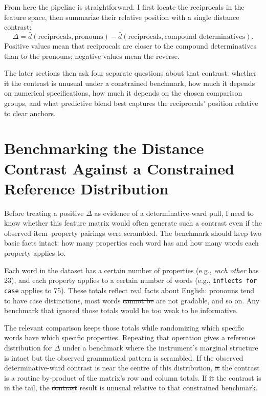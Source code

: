 \documentclass[12pt]{article}
\providecommand{\mention}[1]{\textit{#1}}
\providecommand{\DIFaddtex}[1]{{\protect\color{DIFgreen}#1}} %
\providecommand{\DIFdeltex}[1]{{\protect\color{red}\sout{#1}}}                      %
\providecommand{\DIFaddbegin}{} %
\providecommand{\DIFaddend}{} %
\providecommand{\DIFdelbegin}{} %
\providecommand{\DIFdelend}{} %
\providecommand{\DIFadd}[1]{\texorpdfstring{\DIFaddtex{#1}}{#1}} %
\providecommand{\DIFdel}[1]{\texorpdfstring{\DIFdeltex{#1}}{}} %
\newcommand{\DIFscaledelfig}{0.5}
\newlength{\DIFdelgraphicswidth} %
\newlength{\DIFdelgraphicsheight} %
\newcommand{\DIFaddincludegraphics}[2][]{{\color{DIFgreen}\fbox{\DIFOincludegraphics[#1]{#2}}}} %
\newcommand{\DIFdelincludegraphics}[2][]{%
\sbox{\DIFdelgraphicsbox}{\DIFOincludegraphics[#1]{#2}}%
\settoboxwidth{\DIFdelgraphicswidth}{\DIFdelgraphicsbox} %
\settoboxtotalheight{\DIFdelgraphicsheight}{\DIFdelgraphicsbox} %
\scalebox{\DIFscaledelfig}{%
\parbox[b]{\DIFdelgraphicswidth}{\usebox{\DIFdelgraphicsbox}\\[-\baselineskip] \rule{\DIFdelgraphicswidth}{0em}}\llap{\resizebox{\DIFdelgraphicswidth}{\DIFdelgraphicsheight}{%
\setlength{\unitlength}{\DIFdelgraphicswidth}%
\begin{picture}(1,1)%
\thicklines\linethickness{2pt} %
{\color[rgb]{1,0,0}\put(0,0){\framebox(1,1){}}}%
{\color[rgb]{1,0,0}\put(0,0){\line( 1,1){1}}}%
{\color[rgb]{1,0,0}\put(0,1){\line(1,-1){1}}}%
\end{picture}%
}\hspace*{3pt}}} %
} %
\DeclareRobustCommand{\DIFaddbegin}{\DIFOaddbegin \let\includegraphics\DIFaddincludegraphics} %
\DeclareRobustCommand{\DIFaddend}{\DIFOaddend \let\includegraphics\DIFOincludegraphics} %
\DeclareRobustCommand{\DIFdelbegin}{\DIFOdelbegin \let\includegraphics\DIFdelincludegraphics} %
\DeclareRobustCommand{\DIFdelend}{\DIFOaddend \let\includegraphics\DIFOincludegraphics} %
\begin{document}
From here the pipeline is straightforward. I first locate the reciprocals in the feature space, then summarize their relative position with a single distance contrast:
\[
\Delta = \bar d(\text{reciprocals},\text{pronouns})
       - \bar d(\text{reciprocals},\text{compound determinatives}).
\]
Positive values mean that reciprocals are closer to the compound determinatives than to the pronouns; negative values mean the reverse.

The later sections then ask four separate questions about that contrast: whether \DIFdelbegin \DIFdel{it }\DIFdelend \DIFaddbegin \DIFadd{the contrast }\DIFaddend is unusual under a constrained benchmark, how much it depends on numerical specifications, how much it depends on the chosen comparison groups, and what predictive blend best captures the reciprocals' position relative to clear anchors.

\FloatBarrier

\section{Benchmarking the Distance Contrast Against a Constrained Reference Distribution}

Before treating a positive \(\Delta\) as evidence of a determinative-ward pull, I need to know whether this feature matrix would often generate such a contrast even if the observed item--property pairings were scrambled. The benchmark should keep two basic facts intact: how many properties each word has and how many words each property applies to.

Each word in the dataset has a certain number of properties (e.g., \mention{each other} has 23), and each property applies to a certain number of words (e.g., \texttt{inflects for case} applies to 75). These totals reflect real facts about English: pronouns tend to have case distinctions, most words \DIFdelbegin \DIFdel{cannot be }\DIFdelend \DIFaddbegin \DIFadd{are not }\DIFaddend gradable, and so on. Any benchmark that ignored those totals would be too weak to be informative.

The relevant comparison keeps those totals while randomizing which specific words have which specific properties. Repeating that operation gives a reference distribution for \(\Delta\) under a benchmark where the instrument's marginal structure is intact but the observed grammatical pattern is scrambled. If the observed determinative-ward contrast is near the centre of this distribution, \DIFdelbegin \DIFdel{it }\DIFdelend \DIFaddbegin \DIFadd{the contrast }\DIFaddend is a routine by-product of the matrix's row and column totals. If \DIFdelbegin \DIFdel{it }\DIFdelend \DIFaddbegin \DIFadd{the contrast }\DIFaddend is in the tail, the \DIFdelbegin \DIFdel{contrast }\DIFdelend \DIFaddbegin \DIFadd{result }\DIFaddend is unusual relative to that constrained benchmark.
\end{document}
